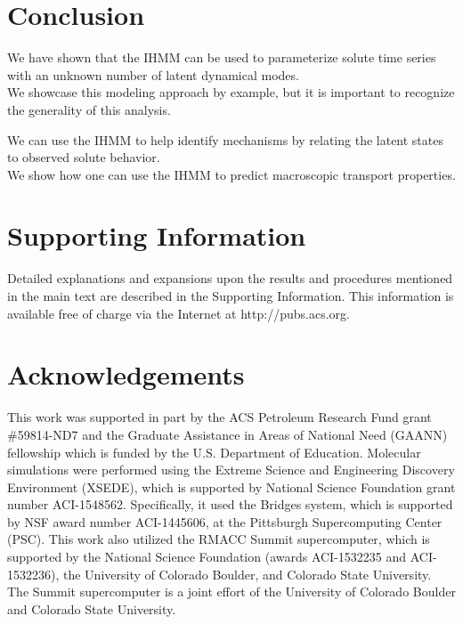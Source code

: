 \documentclass{article}
\begin{document}
  \section{Conclusion}
  
  \noindent We have shown that the IHMM can be used to parameterize solute time series
  with an unknown number of latent dynamical modes. \\
  
  \noindent We showcase this modeling approach by example, but it is important to
  recognize the generality of this analysis.
  
  \noindent We can use the IHMM to help identify mechanisms by relating the latent
  states to observed solute behavior. \\
  
  \noindent We show how one can use the IHMM to predict macroscopic transport properties. \\
  
  \section*{Supporting Information}

  Detailed explanations and expansions upon the results and procedures mentioned in
  the main text are described in the Supporting Information. This information is
  available free of charge via the Internet at http://pubs.acs.org.

  \section*{Acknowledgements}

  This work was supported in part by the ACS Petroleum Research Fund
  grant \#59814-ND7 and the Graduate Assistance in Areas of National Need (GAANN) 
  fellowship which is funded by the U.S. Department of Education. 
  Molecular simulations were performed using the Extreme Science and
  Engineering Discovery Environment (XSEDE), which is supported by National
  Science Foundation grant number ACI-1548562. Specifically, it used the Bridges
  system, which is supported by NSF award number ACI-1445606, at the Pittsburgh
  Supercomputing Center (PSC). This work also utilized the RMACC Summit supercomputer,
  which is supported by the National Science Foundation (awards ACI-1532235 and
  ACI-1532236), the University of Colorado Boulder, and Colorado State
  University. The Summit supercomputer is a joint effort of the University of
  Colorado Boulder and Colorado State University.

  \clearpage

  
  


\end{document}
